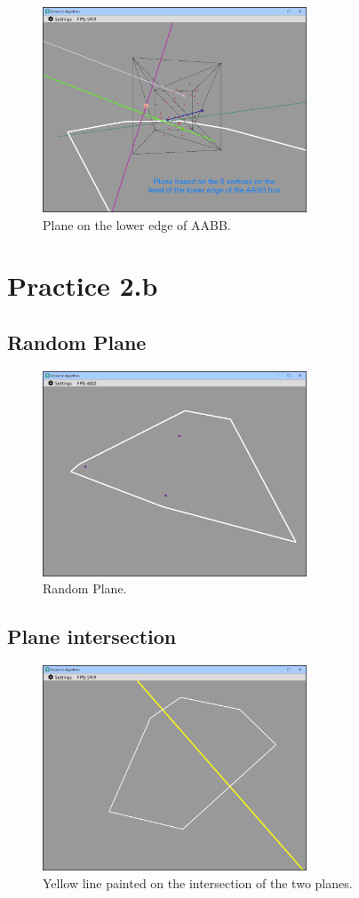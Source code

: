 \documentclass[12pt,a4paper,english]{article}
\begin{document}
\begin{figure}[H]
    \centering
    \includegraphics[width=0.7\textwidth]{p2a-6}
    \caption[]{Plane on the lower edge of AABB.}
    \label{fig:p2a-6}
\end{figure}

\section{Practice 2.b}
\subsection{Random Plane}

\begin{figure}[H]
    \centering
    \includegraphics[width=0.7\textwidth]{p2b-1}
    \caption[]{Random Plane.}
    \label{fig:p2b-1}
\end{figure}

\subsection{Plane intersection}

\begin{figure}[H]
    \centering
    \includegraphics[width=0.7\textwidth]{p2b-2}
    \caption[]{Yellow line painted on the intersection of the two planes.}
    \label{fig:p2b-2}
\end{figure}
\end{document}
